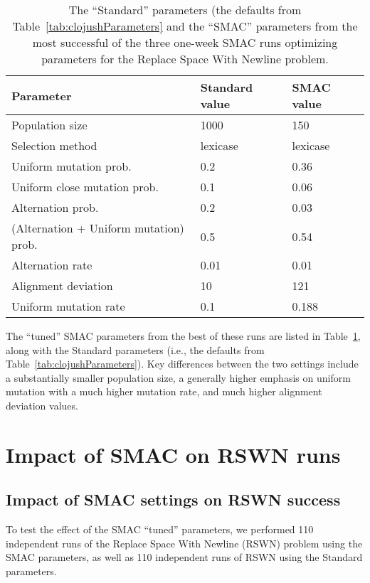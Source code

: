 \begin{table}
	\begin{center}
	\begin{tabular}{p{4cm} p{1.5cm} p{1.5cm}}
		Parameter & Standard value & SMAC  value \\
		\hline
		Population size & 1000 &  150 \\
		Selection method & lexicase & lexicase \\
		\hline
		Uniform mutation prob. & 0.2 & 0.36 \\
		Uniform close mutation prob. & 0.1 & 0.06 \\
		Alternation prob. & 0.2 & 0.03 \\
		(Alternation \linebreak + \quad Uniform mutation) prob. & 0.5 & 0.54 \\
		\hline
		Alternation rate & 0.01 & 0.01 \\
		Alignment deviation & 10 & 121 \\
		\hline
		Uniform mutation rate & 0.1 & 0.188
	\end{tabular}
	\end{center}
	\caption{The ``Standard'' parameters (the defaults from Table~\ref{tab:clojushParameters} and the ``SMAC'' parameters from the most successful of the three one-week SMAC
	runs optimizing parameters for the Replace Space With Newline problem.}
	\label{tab:SMACtunedParameters}
\end{table}

The ``tuned'' SMAC parameters from the best of these runs are listed in
Table~\ref{tab:SMACtunedParameters}, along with the Standard parameters
(i.e., the defaults from Table~\ref{tab:clojushParameters}). Key differences
between the two settings include a substantially smaller population size,
a generally higher emphasis on uniform mutation with a much higher
mutation rate, and much higher alignment deviation values.

\section{Impact of SMAC on RSWN runs}
\label{sec:SMACimpact}

\subsection{Impact of SMAC settings on RSWN success}
\label{sec:SMACsuccessRSWN}

To test the effect of the SMAC ``tuned'' parameters, we performed 110
independent runs of the Replace Space With Newline (RSWN) problem using the
SMAC parameters, as well as 110 independent runs of RSWN using the
Standard parameters.

